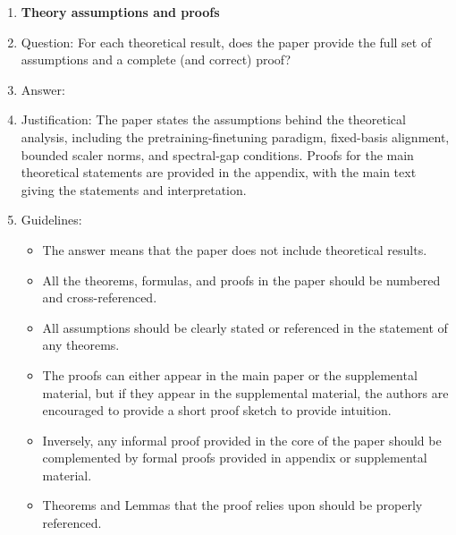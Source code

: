 \begin{enumerate}
\item {\bf Theory assumptions and proofs}
    \item[] Question: For each theoretical result, does the paper provide the full set of assumptions and a complete (and correct) proof?
    \item[] Answer: \answerYes{}
    \item[] Justification: The paper states the assumptions behind the theoretical analysis, including the pretraining-finetuning paradigm, fixed-basis alignment, bounded scaler norms, and spectral-gap conditions. Proofs for the main theoretical statements are provided in the appendix, with the main text giving the statements and interpretation.
    \item[] Guidelines:
    \begin{itemize}
        \item The answer \answerNA{} means that the paper does not include theoretical results. 
        \item All the theorems, formulas, and proofs in the paper should be numbered and cross-referenced.
        \item All assumptions should be clearly stated or referenced in the statement of any theorems.
        \item The proofs can either appear in the main paper or the supplemental material, but if they appear in the supplemental material, the authors are encouraged to provide a short proof sketch to provide intuition. 
        \item Inversely, any informal proof provided in the core of the paper should be complemented by formal proofs provided in appendix or supplemental material.
        \item Theorems and Lemmas that the proof relies upon should be properly referenced. 
    \end{itemize}


\end{enumerate}
